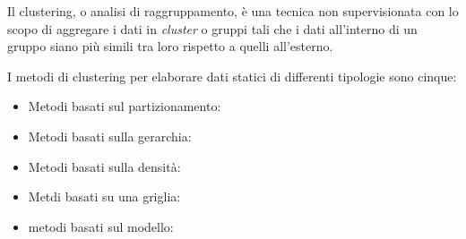 Il clustering, o analisi di raggruppamento, è una tecnica non supervisionata con lo scopo di aggregare i dati in \textit{cluster} o gruppi
tali che i dati all'interno di un gruppo siano più simili tra loro rispetto a quelli all'esterno\cite{liao2005clustering, zazzarro2009clustering}.

I metodi di clustering per elaborare dati statici di differenti tipologie sono cinque:

\begin{itemize}
  \item Metodi basati sul partizionamento:
  \item Metodi basati sulla gerarchia:
  \item Metodi basati sulla densità:
  \item Metdi basati su una griglia:
  \item metodi basati sul modello:
\end{itemize}


